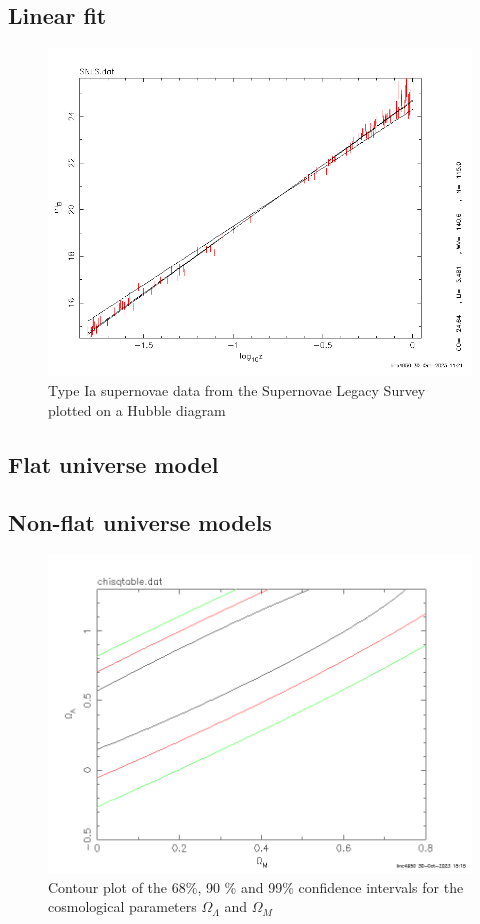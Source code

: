\documentclass[11pt]{article}
\begin{document}
\subsection{Linear fit}
\begin{figure}[htbp]
	\centering
	\includegraphics[width=0.8\linewidth]{snls.png}
	\caption{Type Ia supernovae data from the Supernovae Legacy Survey plotted on a Hubble diagram}
	\label{fig:snls}
\end{figure}

\subsection{Flat universe model}

\subsection{Non-flat universe models}
\begin{figure}[htbp]
	\centering
	\includegraphics[width=0.8\linewidth]{nonflat.png}
	\caption{Contour plot of the 68\%, 90 \% and 99\% confidence intervals for the cosmological parameters $\Omega_\Lambda$ and $\Omega_M$}
	\label{fig:nonflat}
\end{figure}
\end{document}

